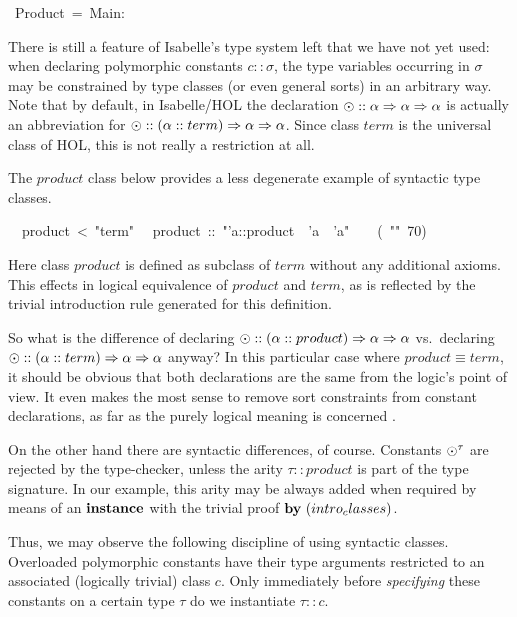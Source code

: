 \begin{isabelle}%
%
~Product~=~Main:%
\begin{isamarkuptext}%
\medskip\noindent There is still a feature of Isabelle's type system
 left that we have not yet used: when declaring polymorphic constants
 $c :: \sigma$, the type variables occurring in $\sigma$ may be
 constrained by type classes (or even general sorts) in an arbitrary
 way.  Note that by default, in Isabelle/HOL the declaration $\odot
 :: \alpha \Rightarrow \alpha \Rightarrow \alpha$ is actually an abbreviation for
 $\odot :: (\alpha::term) \Rightarrow \alpha \Rightarrow \alpha$.  Since class $term$
 is the universal class of HOL, this is not really a restriction at
 all.

 The $product$ class below provides a less degenerate example of
 syntactic type classes.%
\end{isamarkuptext}%
\isanewline
~~product~<~{"}term{"}\isanewline
{}\isanewline
~~product~::~{"}'a::product~{\isasymRightarrow}~'a~{\isasymRightarrow}~'a{"}~~~~(~{"}{\isasymotimes}{"}~70)%
\begin{isamarkuptext}%
Here class $product$ is defined as subclass of $term$ without any
 additional axioms.  This effects in logical equivalence of $product$
 and $term$, as is reflected by the trivial introduction rule
 generated for this definition.

 \medskip So what is the difference of declaring $\odot :: (\alpha ::
 product) \Rightarrow \alpha \Rightarrow \alpha$ vs.\ declaring $\odot :: (\alpha ::
 term) \Rightarrow \alpha \Rightarrow \alpha$ anyway?  In this particular case where
 $product \equiv term$, it should be obvious that both declarations
 are the same from the logic's point of view.  It even makes the most
 sense to remove sort constraints from constant declarations, as far
 as the purely logical meaning is concerned \cite{Wenzel:1997:TPHOL}.

 On the other hand there are syntactic differences, of course.
 Constants $\odot^\tau$ are rejected by the type-checker, unless the
 arity $\tau :: product$ is part of the type signature.  In our
 example, this arity may be always added when required by means of an
 ${\mathord{\mathbf{instance}}}$ with the trivial proof $\BY{intro_classes}$.

 \medskip Thus, we may observe the following discipline of using
 syntactic classes.  Overloaded polymorphic constants have their type
 arguments restricted to an associated (logically trivial) class $c$.
 Only immediately before \emph{specifying} these constants on a
 certain type $\tau$ do we instantiate $\tau :: c$.


\end{isamarkuptext}
\end{isabelle}
